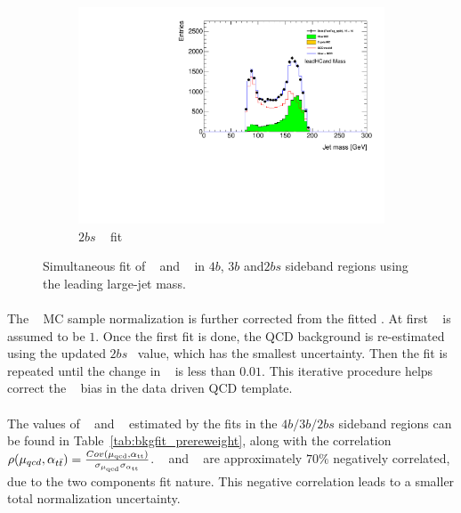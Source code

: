 \begin{figure}[htb!]
    \hspace{-4cm}
    \begin{subfigure}[b]{0.3\textwidth}
        \includegraphics[width=\textwidth,angle=-90]{figures/boosted/Fit/fitNorm_i2s.pdf}
        \caption{$2bs$ \mleadJ~ fit}
        \label{fig:ttbar-fit-2bs}
    \end{subfigure}
   \caption{Simultaneous fit of \muqcd~ and \alphatt~ in $4b$, $3b$ and$2bs$ sideband regions using the leading large-\R jet mass.}
  \label{fig:ttbar-fit}
\end{figure}

\paragraph{}
The \ttbar~ MC sample normalization is further corrected from the fitted \alphatt.
At first \alphatt~ is assumed to be $1$.
Once the first fit is done, the QCD background is re-estimated using the updated $2bs$ \alphatt~value, which has the smallest uncertainty.
Then the fit is repeated until the change in \alphatt~ is less than $0.01$.
This iterative procedure helps correct the \alphatt~ bias in the data driven QCD template.

\paragraph{}
The values of \muqcd~ and \alphatt~ estimated by the fits in the $4b/3b/2bs$ sideband regions can be found in Table~\ref{tab:bkgfit_prereweight}, along with the correlation $\rho(\mu_{qcd},\alpha_{t\bar{t}}) = \frac{Cov(\rm \mu_{qcd},\rm \alpha_{tt})}{\rm \sigma_{\mu_{qcd}} \rm \sigma_{\alpha_{tt}} }$. 
\muqcd~ and \alphatt~  are approximately $70\%$ negatively correlated, due to the two components fit nature.
This negative correlation leads to a smaller total normalization uncertainty.

